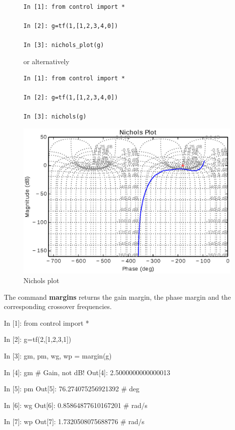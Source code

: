 \begin{figure}[htbp]
\begin{minipage}[t]{0.55\textwidth}
  \vspace{0pt}
\begin{lstlisting}[linewidth=7cm,xleftmargin=0cm]
In [1]: from control import *

In [2]: g=tf(1,[1,2,3,4,0])

In [3]: nichols_plot(g)
\end{lstlisting}

or alternatively

\begin{lstlisting}[linewidth=7cm,xleftmargin=0cm]
In [1]: from control import *

In [2]: g=tf(1,[1,2,3,4,0])

In [3]: nichols(g)
\end{lstlisting}

\end{minipage}%
\begin{minipage}[t]{0.5\textwidth}
  \vspace{0pt} \centering
  \includegraphics[width=\textwidth]{eps/nichols.eps}
\end{minipage}
\caption{Nichols plot}
\label{F8}
\end{figure}

The command \textbf{margins} returns the gain margin, the phase margin and the 
corresponding crossover frequencies.

\begin{code}
In [1]: from control import *

In [2]: g=tf(2,[1,2,3,1])

In [3]: gm, pm, wg, wp = margin(g)

In [4]: gm			# Gain, not dB!
Out[4]: 2.5000000000000013

In [5]: pm
Out[5]: 76.274075256921392	# deg

In [6]: wg
Out[6]: 0.85864877610167201	# rad/s

In [7]: wp
Out[7]: 1.7320508075688776	# rad/s
\end{code}

